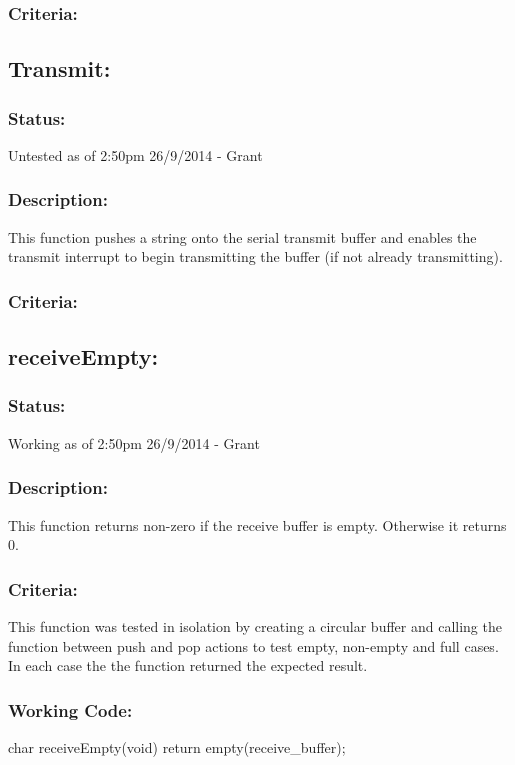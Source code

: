 \documentclass[]{article}
\begin{document}
\subsubsection{Criteria:}

\subsection{Transmit:}
\subsubsection{Status:}
Untested as of 2:50pm 26/9/2014 - Grant

\subsubsection{Description:}
This function pushes a string onto the serial transmit buffer and enables the transmit interrupt to begin transmitting the buffer (if not already transmitting).

\subsubsection{Criteria:}

\subsection{receiveEmpty:}
\subsubsection{Status:}
Working as of 2:50pm 26/9/2014 - Grant

\subsubsection{Description:}
This function returns non-zero if the receive buffer is empty. Otherwise it returns 0.

\subsubsection{Criteria:}
This function was tested in isolation by creating a circular buffer and calling the function between push and pop actions to test empty, non-empty and full cases. In each case the the function returned the expected result.

\subsubsection{Working Code:}
char receiveEmpty(void)
{
	return empty(receive\_buffer);
}
\end{document}
